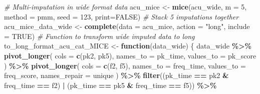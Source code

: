 \documentclass{article}
\newenvironment{Shaded}{\begin{snugshade}}{\end{snugshade}}
\newcommand{\AttributeTok}[1]{\textcolor[rgb]{0.13,0.29,0.53}{#1}}
\newcommand{\CommentTok}[1]{\textcolor[rgb]{0.56,0.35,0.01}{\textit{#1}}}
\newcommand{\ConstantTok}[1]{\textcolor[rgb]{0.56,0.35,0.01}{#1}}
\newcommand{\ControlFlowTok}[1]{\textcolor[rgb]{0.13,0.29,0.53}{\textbf{#1}}}
\newcommand{\DecValTok}[1]{\textcolor[rgb]{0.00,0.00,0.81}{#1}}
\newcommand{\FunctionTok}[1]{\textcolor[rgb]{0.13,0.29,0.53}{\textbf{#1}}}
\newcommand{\NormalTok}[1]{#1}
\newcommand{\OtherTok}[1]{\textcolor[rgb]{0.56,0.35,0.01}{#1}}
\newcommand{\SpecialCharTok}[1]{\textcolor[rgb]{0.81,0.36,0.00}{\textbf{#1}}}
\newcommand{\StringTok}[1]{\textcolor[rgb]{0.31,0.60,0.02}{#1}}
\begin{document}
\begin{Shaded}
\begin{Highlighting}[]
\CommentTok{\# Multi{-}imputation in wide format data}
\NormalTok{acu\_mice }\OtherTok{\textless{}{-}} \FunctionTok{mice}\NormalTok{(acu\_wide, }\AttributeTok{m =} \DecValTok{5}\NormalTok{, }\AttributeTok{method =} \StringTok{\textquotesingle{}pmm\textquotesingle{}}\NormalTok{, }\AttributeTok{seed =} \DecValTok{123}\NormalTok{, }\AttributeTok{print=}\ConstantTok{FALSE}\NormalTok{)}
\CommentTok{\# Stack 5 imputations together}
\NormalTok{acu\_mice\_data\_wide }\OtherTok{\textless{}{-}} \FunctionTok{complete}\NormalTok{(}\AttributeTok{data =}\NormalTok{ acu\_mice, }\AttributeTok{action =} \StringTok{"long"}\NormalTok{, }\AttributeTok{include =} \ConstantTok{TRUE}\NormalTok{)}
\CommentTok{\# Function to transform wide imputed data to long}
\NormalTok{to\_long\_format\_acu\_cat\_MICE }\OtherTok{\textless{}{-}} \ControlFlowTok{function}\NormalTok{(data\_wide) \{}
\NormalTok{  data\_wide }\SpecialCharTok{\%\textgreater{}\%}
    \FunctionTok{pivot\_longer}\NormalTok{(}
      \AttributeTok{cols =} \FunctionTok{c}\NormalTok{(}\StringTok{\textquotesingle{}pk2\textquotesingle{}}\NormalTok{, }\StringTok{\textquotesingle{}pk5\textquotesingle{}}\NormalTok{), }
      \AttributeTok{names\_to =} \StringTok{\textquotesingle{}pk\_time\textquotesingle{}}\NormalTok{,}
      \AttributeTok{values\_to =} \StringTok{\textquotesingle{}pk\_score\textquotesingle{}}
\NormalTok{    ) }\SpecialCharTok{\%\textgreater{}\%}
    \FunctionTok{pivot\_longer}\NormalTok{(}
      \AttributeTok{cols =} \FunctionTok{c}\NormalTok{(}\StringTok{\textquotesingle{}f2\textquotesingle{}}\NormalTok{, }\StringTok{\textquotesingle{}f5\textquotesingle{}}\NormalTok{), }
      \AttributeTok{names\_to =} \StringTok{\textquotesingle{}freq\_time\textquotesingle{}}\NormalTok{,}
      \AttributeTok{values\_to =} \StringTok{\textquotesingle{}freq\_score\textquotesingle{}}\NormalTok{,}
      \AttributeTok{names\_repair =} \StringTok{\textquotesingle{}unique\textquotesingle{}}
\NormalTok{    ) }\SpecialCharTok{\%\textgreater{}\%}
    \FunctionTok{filter}\NormalTok{((pk\_time }\SpecialCharTok{==} \StringTok{\textquotesingle{}pk2\textquotesingle{}} \SpecialCharTok{\&}\NormalTok{ freq\_time }\SpecialCharTok{==} \StringTok{\textquotesingle{}f2\textquotesingle{}}\NormalTok{) }\SpecialCharTok{|}\NormalTok{ (pk\_time }\SpecialCharTok{==} \StringTok{\textquotesingle{}pk5\textquotesingle{}} \SpecialCharTok{\&}\NormalTok{ freq\_time }\SpecialCharTok{==} \StringTok{\textquotesingle{}f5\textquotesingle{}}\NormalTok{)) }\SpecialCharTok{\%\textgreater{}\%}

\end{Highlighting}
\end{Shaded}
\end{document}
